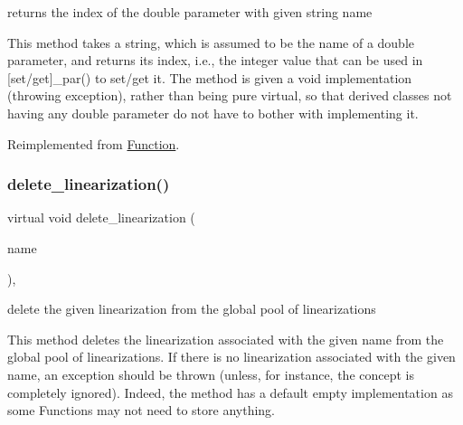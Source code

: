 returns the index of the double parameter with given string name 

This method takes a string, which is assumed to be the name of a double parameter, and returns its index, i.\+e., the integer value that can be used in \mbox{[}set/get\mbox{]}\+\_\+par() to set/get it. The method is given a void implementation (throwing exception), rather than being pure virtual, so that derived classes not having any double parameter do not have to bother with implementing it. 

Reimplemented from \mbox{\hyperlink{class_s_m_spp__di__unipi__it_1_1_function_a6d353ac3d1200d9bea89235da61bc4f3}{Function}}.

\mbox{\label{class_s_m_spp__di__unipi__it_1_1_c05_function_a538bfc1740cb18a36b0edf8b35085e2c}} 
\subsubsection{\texorpdfstring{delete\+\_\+linearization()}{delete\_linearization()}}
{\footnotesize\ttfamily virtual void delete\+\_\+linearization (\begin{DoxyParamCaption}\item[{const \mbox{\hyperlink{class_s_m_spp__di__unipi__it_1_1_c05_function_ae90bf93c6d4b4ada66791c735d1c03cc}{Linearization\+Name}}}]{name }\end{DoxyParamCaption})\hspace{0.3cm}{\ttfamily [inline]}, {\ttfamily [virtual]}}



delete the given linearization from the global pool of linearizations 

This method deletes the linearization associated with the given name from the global pool of linearizations. If there is no linearization associated with the given name, an exception should be thrown (unless, for instance, the concept is completely ignored). Indeed, the method has a default empty implementation as some Functions may not need to store anything. \mbox{\label{class_s_m_spp__di__unipi__it_1_1_c05_function_a465a771c115acf8d5f4e32e22f003014}} 
